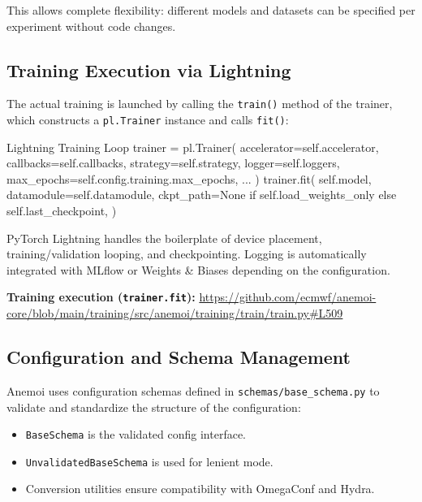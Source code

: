 This allows complete flexibility: different models and datasets can be specified per experiment without code changes.

%
\subsection{Training Execution via Lightning}

The actual training is launched by calling the \texttt{train()} method of the trainer, which constructs a \texttt{pl.Trainer} instance and calls \texttt{fit()}:

\begin{codeonly}{Lightning Training Loop}
trainer = pl.Trainer(
    accelerator=self.accelerator,
    callbacks=self.callbacks,
    strategy=self.strategy,
    logger=self.loggers,
    max_epochs=self.config.training.max_epochs,
    ...
)
trainer.fit(
    self.model,
    datamodule=self.datamodule,
    ckpt_path=None if self.load_weights_only else self.last_checkpoint,
)
\end{codeonly}

PyTorch Lightning handles the boilerplate of device placement, training/validation looping, and checkpointing. Logging is automatically integrated with MLflow or Weights \& Biases depending on the configuration.

{\bf Training execution (\texttt{trainer.fit}):} \url{https://github.com/ecmwf/anemoi-core/blob/main/training/src/anemoi/training/train/train.py#L509}


%
\subsection{Configuration and Schema Management}

Anemoi uses configuration schemas defined in \texttt{schemas/base\_schema.py} to validate and standardize the structure of the configuration:

\begin{itemize}
  \item \texttt{BaseSchema} is the validated config interface.
  \item \texttt{UnvalidatedBaseSchema} is used for lenient mode.
  \item Conversion utilities ensure compatibility with OmegaConf and Hydra.
\end{itemize}

